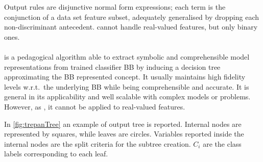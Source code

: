 \documentclass[12pt,a4paper,openright,twoside]{book}
\begin{document}
Output rules are disjunctive normal form expressions; each term is the conjunction of a data set feature subset, adequately generalised by dropping each non-discriminant antecedent.
%
\real{} cannot handle real-valued features, but only binary ones.

\paragraph{\trepan}\label{par:trepan}

\trepan{} \cite{Craven1996} is a pedagogical algorithm able to extract symbolic and comprehensible model representations from trained classifier BB by inducing a decision tree approximating the BB represented concept.
%
It usually maintains high fidelity levels w.r.t.\ the underlying BB while being comprehensible and accurate.
%
It is general in its applicability and well scalable with complex models or problems.
%
However, as \real{}, it cannot be applied to real-valued features.

In \cref{fig:trepanTree} an example of output tree is reported.
%
Internal nodes are represented by squares, while leaves are circles.
%
Variables reported inside the internal nodes are the split criteria for the subtree creation.
%
$C_i$ are the class labels corresponding to each leaf.
\end{document}
